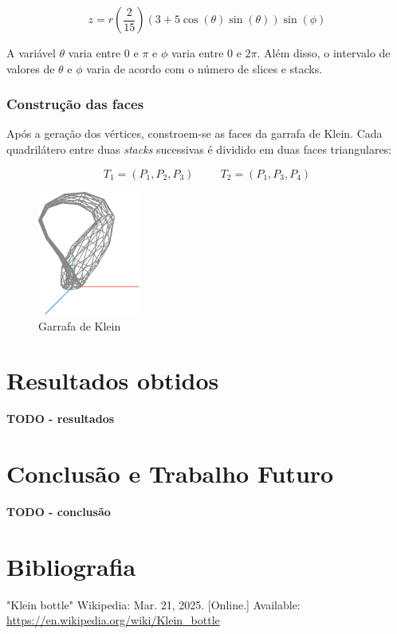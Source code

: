 \documentclass[12pt, a4paper]{article}
\begin{document}
$$
z = r \left( \frac{2}{15} \right) (3 + 5 \cos(\theta) \sin(\theta)) \sin(\phi)
$$

A variável $\theta$ varia entre $0$ e $\pi$ e $\phi$ varia entre $0$ e $2\pi$. Além disso, o
intervalo de valores de $\theta$ e $\phi$ varia de acordo com o número de slices e stacks.

\subsubsection{Construção das faces}

Após a geração dos vértices, constroem-se as faces da garrafa de Klein. Cada quadrilátero entre duas
\emph{stacks} sucessivas é dividido em duas faces triangulares:

$$
T_1 = (P_1, P_2, P_3)
\hspace{1cm}
T_2 = (P_1, P_3, P_4)
$$

\begin{figure}[H]
    \centering
    \includegraphics[width=0.3\textwidth]{res/phase2/figures/kleinBottle.pdf}
    \caption{Garrafa de Klein}
\end{figure}

\section{Resultados obtidos}

\textbf{\color{red} TODO - resultados}

\section{Conclusão e Trabalho Futuro}

\textbf{\color{red} TODO - conclusão}

\begingroup
\section{Bibliografia}
\renewcommand{\section}[2]{}

\begin{thebibliography}{9}
        "Klein bottle"{} Wikipedia: Mar. 21, 2025. [Online.] Available:
        \url{https://en.wikipedia.org/wiki/Klein_bottle}
\end{thebibliography}
\endgroup
\end{document}
